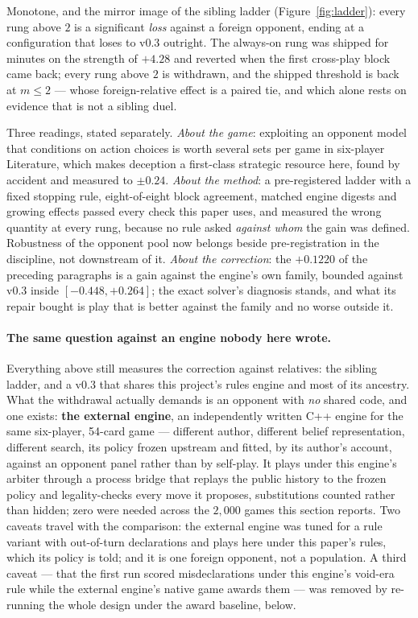 \documentclass[11pt,letterpaper]{article}
\begin{document}
Monotone, and the mirror image of the sibling ladder
(Figure~\ref{fig:ladder}): every rung above $2$ is
a significant \emph{loss} against a foreign opponent, ending at a
configuration that loses to v0.3 outright. The always-on rung was shipped for
minutes on the strength of $+4.28$ and reverted when the first cross-play
block came back; every rung above $2$ is withdrawn, and the shipped threshold
is back at $m \le 2$ --- whose foreign-relative effect is a paired tie, and
which alone rests on evidence that is not a sibling duel.

Three readings, stated separately. \emph{About the game}: exploiting an
opponent model that conditions on action choices is worth several sets per
game in six-player Literature, which makes deception a first-class strategic
resource here, found by accident and measured to $\pm 0.24$. \emph{About the
method}: a pre-registered ladder with a fixed stopping rule, eight-of-eight
block agreement, matched engine digests and growing effects passed every
check this paper uses, and measured the wrong quantity at every rung,
because no rule asked \emph{against whom} the gain was defined. Robustness
of the opponent pool now belongs beside pre-registration in the discipline,
not downstream of it. \emph{About the correction}: the $+0.1220$ of the
preceding paragraphs is a gain against the engine's own family, bounded
against v0.3 inside $[-0.448, +0.264]$; the exact solver's diagnosis stands,
and what its repair bought is play that is better against the family and no
worse outside it.

\paragraph{The same question against an engine nobody here wrote.} Everything
above still measures the correction against relatives: the sibling ladder, and
a v0.3 that shares this project's rules engine and most of its ancestry. What
the withdrawal actually demands is an opponent with \emph{no} shared code, and
one exists: \textbf{the external engine}, an independently written
C++ engine for the same six-player, 54-card game --- different author,
different belief representation, different search, its policy frozen upstream
and fitted, by its author's account, against an opponent panel rather than by
self-play. It plays under this engine's arbiter
through a process bridge that replays the public history to the frozen policy and
legality-checks every move it proposes, substitutions counted rather than
hidden; zero were needed across the $2{,}000$ games this section reports.
Two caveats travel with the comparison: the external engine was tuned for a rule variant
with out-of-turn declarations and plays here under this paper's rules, which
its policy is told; and it is one foreign opponent, not a population. A
third caveat --- that the first run scored misdeclarations under this
engine's void-era rule while the external engine's native game awards them --- was removed
by re-running the whole design under the award baseline, below.
\end{document}

